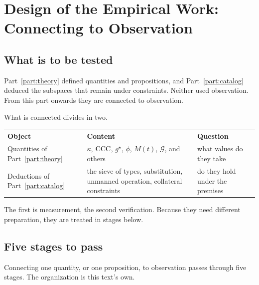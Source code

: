 \chapter{Design of the Empirical Work: Connecting to Observation}
\label{ch:design}

\section{What is to be tested}

Part~\ref{part:theory} defined quantities and propositions, and Part~\ref{part:catalog}
deduced the subspaces that remain under constraints. Neither used observation. From this
part onwards they are connected to observation.

What is connected divides in two.

\begin{center}
\begin{tabularx}{\textwidth}{@{}lXl@{}}
\toprule
Object & Content & Question \\
\midrule
Quantities of Part~\ref{part:theory} & $\kappa$, $\mathrm{CCC}$, $g^\star$, $\phi$, $M(t)$, $\mathcal{G}$, and others & what values do they take \\
Deductions of Part~\ref{part:catalog} & the sieve of types, substitution, unmanned operation, collateral constraints & do they hold under the premises \\
\bottomrule
\end{tabularx}
\label{tab:empirical-targets}
\end{center}

The first is measurement, the second verification. Because they need different preparation,
they are treated in stages below.

\section{Five stages to pass}
\label{sec:five-stages}

Connecting one quantity, or one proposition, to observation passes through five stages.
The organization is this text's own.

